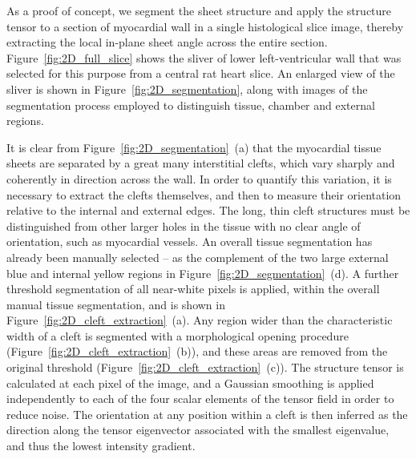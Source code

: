     As a proof of concept, we segment the sheet structure and apply the structure tensor to a section of myocardial wall in a single histological slice image, thereby extracting the local in-plane sheet angle across the entire section. Figure~\ref{fig:2D_full_slice} shows the sliver of lower left-ventricular wall that was selected for this purpose from a central rat heart slice. An enlarged view of the sliver is shown in Figure~\ref{fig:2D_segmentation}, along with images of the segmentation process employed to distinguish tissue, chamber and external regions.
  
    It is clear from Figure~\ref{fig:2D_segmentation}~(a) that the myocardial tissue sheets are separated by a great many interstitial clefts, which vary sharply and coherently in direction across the wall. In order to quantify this variation, it is necessary to extract the clefts themselves, and then to measure their orientation relative to the internal and external edges. The long, thin cleft structures must be distinguished from other larger holes in the tissue with no clear angle of orientation, such as myocardial vessels. An overall tissue segmentation has already been manually selected -- as the complement of the two large external blue and internal yellow regions in Figure~\ref{fig:2D_segmentation}~(d). A further threshold segmentation of all near-white pixels is applied, within the overall manual tissue segmentation, and is shown in Figure~\ref{fig:2D_cleft_extraction}~(a). Any region wider than the characteristic width of a cleft is segmented with a morphological opening procedure (Figure~\ref{fig:2D_cleft_extraction}~(b)), and these areas are removed from the original threshold (Figure~\ref{fig:2D_cleft_extraction}~(c)). The structure tensor is calculated at each pixel of the image, and a Gaussian smoothing is applied independently to each of the four scalar elements of the tensor field in order to reduce noise. The orientation at any position within a cleft is then inferred as the direction along the tensor eigenvector associated with the smallest eigenvalue, and thus the lowest intensity gradient.
  
